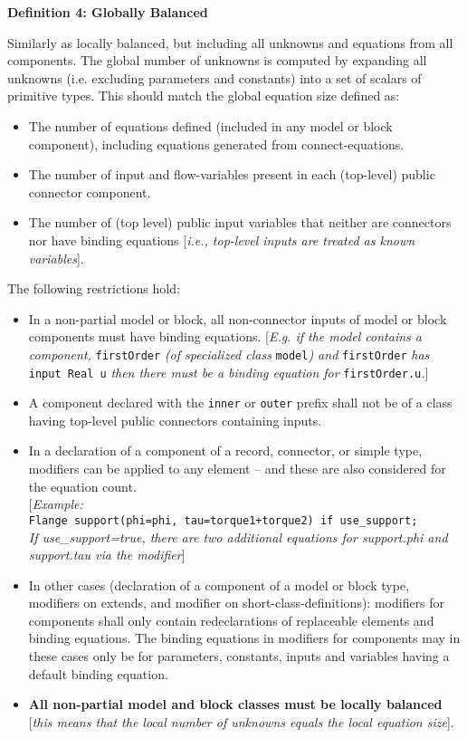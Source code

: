 \textbf{Definition 4: Globally Balanced}

Similarly as locally balanced, but including all unknowns and equations
from all components. The global number of unknowns is computed by
expanding all unknowns (i.e. excluding parameters and constants) into a
set of scalars of primitive types. This should match the global equation
size defined as:

\begin{itemize}
\item
  The number of equations defined (included in any model or block
  component), including equations generated from connect-equations.
\item
  The number of input and flow-variables present in each (top-level)
  public connector component.
\item
  The number of (top level) public input variables that neither are
  connectors nor have binding equations {[}\emph{i.e., top-level inputs
  are treated as known variables}{]}.
\end{itemize}

The following restrictions hold:
\begin{itemize}
\item
  In a non-partial model or block, all non-connector inputs of model or
  block components must have binding equations. {[}\emph{E.g. if the
  model contains a component,} \lstinline!firstOrder! \emph{(of specialized class}
  \lstinline!model!\emph{) and} \lstinline!firstOrder! \emph{has} \lstinline!input Real u! \emph{then
  there must be a binding equation for} \lstinline!firstOrder.u!\emph{.}{]}
\item
  A component declared with the \lstinline!inner! or \lstinline!outer! prefix shall not be of a
  class having top-level public connectors containing inputs.
\item
  In a declaration of a component of a record, connector, or simple
  type, modifiers can be applied to any element -- and these are also
  considered for the equation count.\\
  {[}\emph{Example:}\\
\lstinline!Flange support(phi=phi, tau=torque1+torque2) if use_support;!\\
  \emph{If use\_support=true, there are two additional equations for
  support.phi and support.tau via the modifier}{]}
\item
  In other cases (declaration of a component of a model or block type,
  modifiers on extends, and modifier on short-class-definitions):
  modifiers for components shall only contain redeclarations of
  replaceable elements and binding equations. The binding equations in
  modifiers for components may in these cases only be for parameters,
  constants, inputs and variables having a default binding equation.
\item
  \textbf{All non-partial model and block classes must be locally
  balanced} {[}\emph{this means that the local number of unknowns equals
  the local equation size}{]}.
\end{itemize}

